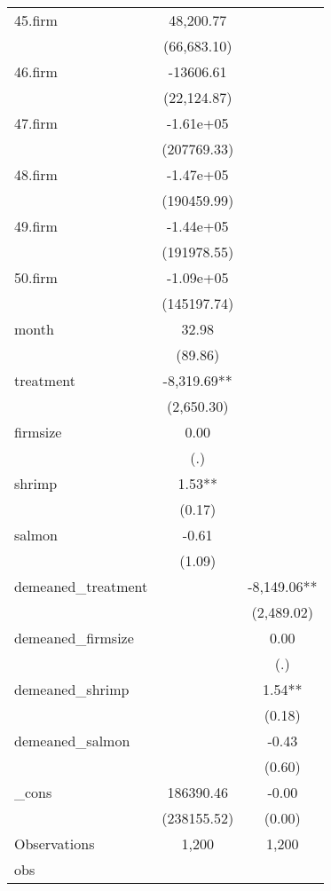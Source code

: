 {\begin{tabular}{l*{2}{c}}
45.firm     &   48,200.77  &              \\
            & (66,683.10)  &              \\
46.firm     &   -13606.61  &              \\
            & (22,124.87)  &              \\
47.firm     &   -1.61e+05  &              \\
            & (207769.33)  &              \\
48.firm     &   -1.47e+05  &              \\
            & (190459.99)  &              \\
49.firm     &   -1.44e+05  &              \\
            & (191978.55)  &              \\
50.firm     &   -1.09e+05  &              \\
            & (145197.74)  &              \\
month       &       32.98  &              \\
            &     (89.86)  &              \\
treatment   &   -8,319.69**&              \\
            &  (2,650.30)  &              \\
firmsize    &        0.00  &              \\
            &         (.)  &              \\
shrimp      &        1.53**&              \\
            &      (0.17)  &              \\
salmon      &       -0.61  &              \\
            &      (1.09)  &              \\
demeaned\_treatment&              &   -8,149.06**\\
            &              &  (2,489.02)  \\
demeaned\_firmsize&              &        0.00  \\
            &              &         (.)  \\
demeaned\_shrimp&              &        1.54**\\
            &              &      (0.18)  \\
demeaned\_salmon&              &       -0.43  \\
            &              &      (0.60)  \\
\_cons      &   186390.46  &       -0.00  \\
            & (238155.52)  &      (0.00)  \\
\hline
Observations&       1,200  &       1,200  \\
obs         &              &              \\
\hline\hline
\end{tabular}
}
